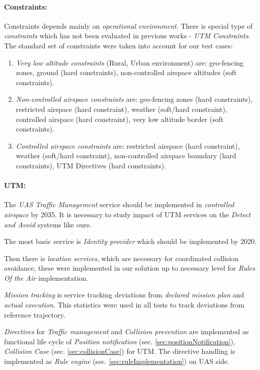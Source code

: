 \paragraph{Constraints:} Constraints depends mainly on \emph{operational environment}. There is special type of \emph{constraints} which has not been evaluated in previous works - \emph{UTM Constraints}. The standard set of constraints were taken into account for our test cases:
\begin{enumerate}
    \item \emph{Very low altitude constraints} (Rural, Urban environment) are: geo-fencing zones, ground (hard constraints), non-controlled airspace altitudes (soft constraints).
    
    \item \emph{Non-controlled airspace constraints} are: geo-fencing zones (hard constraints), restricted airspace (hard constraint), weather (soft/hard constraint), controlled airspace (hard constraint), very low altitude border (soft constraints).
    
    \item \emph{Controlled airspace constraints} are: restricted airspace (hard constraint), weather (soft/hard constraint), non-controlled airspace boundary (hard constraints), UTM Directives (hard constraints).
\end{enumerate}

\paragraph{UTM:} The \emph{UAS Traffic Management} service should be implemented in \emph{controlled airspace} by 2035. It is necessary to study impact of UTM services on the \emph{Detect and Avoid} systems like ours. 

The most basic service is \emph{Identity provider} which should be implemented by 2020. 

Then there is \emph{location services}, which are necessary for coordinated collision avoidance, these were implemented in our solution up to necessary level for \emph{Rules Of the Air} implementation.

\emph{Mission tracking} is service tracking deviations from \emph{declared mission plan} and \emph{actual execution}. This statistics were used in all tests to track deviations from reference trajectory.

\emph{Directives} for \emph{Traffic management} and \emph{Collision prevention} are implemented  as functional life cycle of  \emph{Position notification} (sec. \ref{sec:positionNotification}), \emph{Collision Case} (sec. \ref{sec:collisionCase}) for UTM. The directive handling is implemented as \emph{Rule engine} (sec. \ref{sec:ruleImplementation}) on UAS side.

